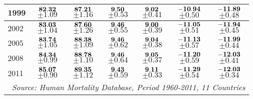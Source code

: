 \documentclass[10pt, titlepage]{article}%
\begin{document}
\begin{table}
\begin{tabular}{||l|c|c|c|c|c|c||}
  1999 &  $\bf 82.32$ $\pm 1.09$& $\bf 87.21$ $\pm 1.16$& $\bf 9.50$ $\pm 0.53$& $\bf 9.02$ $\pm 0.41$& $\bf -10.94$ $\pm 0.50$& $\bf -11.89$ $\pm 0.48$ \\ \hline\hline
  2002 &  $\bf 83.03$ $\pm 1.04$& $\bf 87.60$ $\pm 1.26$& $\bf 9.46$ $\pm 0.55$& $\bf 9.00$ $\pm 0.39$& $\bf -11.05$ $\pm 0.51$& $\bf -11.94$ $\pm 0.45$ \\ \hline\hline
  2005 &  $\bf 83.74$ $\pm 1.05$& $\bf 88.38$ $\pm 1.09$& $\bf 9.46$ $\pm 0.62$& $\bf 9.04$ $\pm 0.38$& $\bf -11.13$ $\pm 0.57$& $\bf -11.99$ $\pm 0.44$ \\ \hline\hline
  2008 &  $\bf 84.34$ $\pm 0.99$& $\bf 88.78$ $\pm 1.10$& $\bf 9.46$ $\pm 0.64$& $\bf 9.05$ $\pm 0.37$& $\bf -11.20$ $\pm 0.59$& $\bf -12.03$ $\pm 0.41$ \\ \hline\hline
  2011 &  $\bf 85.07$ $\pm 0.90$& $\bf 89.35$ $\pm 1.12$& $\bf 9.43$ $\pm 0.59$& $\bf 9.11$ $\pm 0.33$& $\bf -11.29$ $\pm 0.54$& $\bf -12.03$ $\pm 0.34$ \\ \hline\hline
     
\multicolumn{7}{||r||}{{\em Source: Human Mortality Database, Period 1960-2011, 11 Countries}} \\ \hline\hline
\end{tabular}
\label{table5a}
\end{table}
\end{document}
